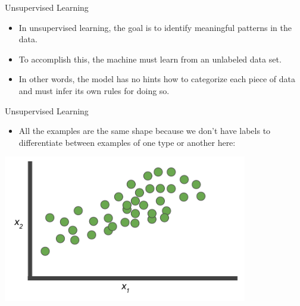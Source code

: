 \documentclass{beamer}
\begin{document}
\begin{frame}{Unsupervised Learning}

\begin{itemize}

\item In unsupervised learning, the goal is to identify meaningful patterns in the data. 

\item To accomplish this, the machine must learn from an unlabeled data set. 

\item In other words, the model has no hints how to categorize each piece of data and must infer its own rules for doing so.

\end{itemize}

\end{frame}


\begin{frame}{Unsupervised Learning}

\begin{itemize}
\item All the examples are the same shape because we don't have labels to differentiate between examples of one type or another here:
\end{itemize}

\medskip

\includegraphics[width=0.8\textwidth]{images/Graph4.png}

\end{frame}

\end{document}
